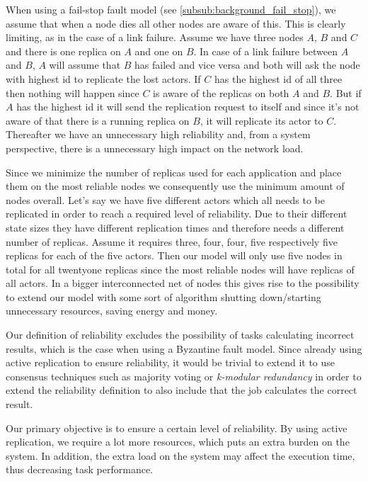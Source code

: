 \documentclass{cslthse-msc}
\begin{document}

When using a fail-stop fault model (see \cref{subsub:background_fail_stop}), we assume that when a node dies all other nodes are aware of this. This is clearly limiting, as in the case of a link failure. Assume we have three nodes $A$, $B$ and $C$ and there is one replica on $A$ and one on $B$. In case of a link failure between $A$ and $B$, $A$ will assume that $B$ has failed and vice versa and both will ask the node with highest id to replicate the lost actors. If $C$ has the highest id of all three then nothing will happen since $C$ is aware of the replicas on both $A$ and $B$. But if $A$ has the highest id it will send the replication request to itself and since it's not aware of that there is a running replica on $B$, it will replicate its actor to $C$. Thereafter we have an unnecessary high reliability and, from a system perspective, there is a unnecessary high impact on the network load.

Since we minimize the number of replicas used for each application and place them on the most reliable nodes we consequently use the minimum amount of nodes overall. Let's say we have five different actors which all needs to be replicated in order to reach a required level of reliability. Due to their different state sizes they have different replication times and therefore needs a different number of replicas. Assume it requires three, four, four, five respectively five replicas for each of the five actors. Then our model will only use five nodes in total for all twentyone replicas since the most reliable nodes will have replicas of all actors. In a bigger interconnected net of nodes this gives rise to the possibility to extend our model with some sort of algorithm shutting down/starting unnecessary resources, saving energy and money.

Our definition of reliability excludes the possibility of tasks calculating incorrect results, which is the case when using a Byzantine fault model. Since already using active replication to ensure reliability, it would be trivial to extend it to use consensus techniques such as majority voting or \emph{k-modular redundancy} in order to extend the reliability definition to also include that the job calculates the correct result.

Our primary objective is to ensure a certain level of reliability. By using active replication, we require a lot more resources, which puts an extra burden on the system. In addition, the extra load on the system may affect the execution time, thus decreasing task performance.
\end{document}
